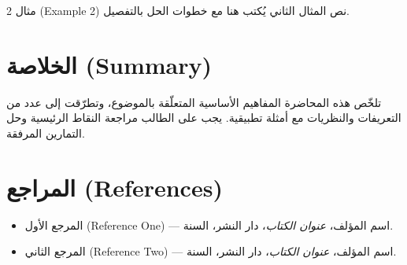 \documentclass[11pt,a4paper]{article}
\newcommand{\sectiondivider}{%
  \par\noindent{\color{accent}\rule{\linewidth}{0.8pt}}\par\vspace{0.4em}%
}
\begin{document}
\begin{examplebox}{مثال 2 (Example 2)}
نص المثال الثاني يُكتب هنا مع خطوات الحل بالتفصيل.
\end{examplebox}

\section{الخلاصة (Summary)}
\sectiondivider
تلخّص هذه المحاضرة المفاهيم الأساسية المتعلّقة بالموضوع، وتطرّقت إلى
عدد من التعريفات والنظريات مع أمثلة تطبيقية. يجب على الطالب مراجعة
النقاط الرئيسية وحل التمارين المرفقة.

\section{المراجع (References)}
\sectiondivider
\begin{itemize}[leftmargin=2em, itemsep=0.2em]
  \item المرجع الأول (Reference One) — اسم المؤلف، \emph{عنوان الكتاب}، دار النشر، السنة.
  \item المرجع الثاني (Reference Two) — اسم المؤلف، \emph{عنوان الكتاب}، دار النشر، السنة.
\end{itemize}
\end{document}
